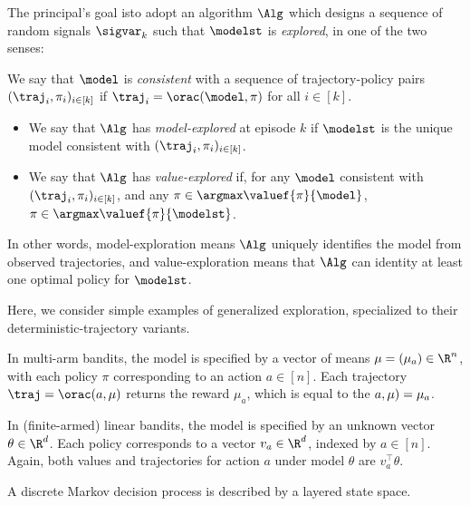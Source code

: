 The principal's goal isto adopt an algorithm $\Alg$ which designs a sequence of random signals $\sigvar_k$ such that $\modelst$ is \emph{explored}, in one of the two senses:
\begin{definition} We say that $\model$ is \emph{consistent} with a sequence of trajectory-policy pairs $(\traj_i,\pi_i)_{i \in [k]}$ if $\traj_i = \orac(\model,\pi)$ for all $i \in [k]$. 
\begin{itemize}
\item We say that $\Alg$ has \emph{model-explored} at episode $k$ if $\modelst$ is the unique model consistent with $(\traj_i,\pi_i)_{i \in [k]}$.
\item We say that $\Alg$ has \emph{value-explored} if, for any $\model$ consistent with $(\traj_i,\pi_i)_{i \in [k]}$, and any $\pi \in \argmax\valuef{\pi}{\model}$, $\pi \in \argmax\valuef{\pi}{\modelst}$.
\end{itemize} 
\end{definition}
In other words, model-exploration means $\Alg$ uniquely identifies the model from observed trajectories, and value-exploration means that $\Alg$ can identity at least one optimal policy for $\modelst$. 



Here, we consider simple examples of generalized exploration, specialized to their deterministic-trajectory variants. 
\begin{example} In multi-arm bandits, the model is specified by a vector of means $\mu  = (\mu_a) \in \R^{n}$,  with each policy $\pi$ corresponding to an action $a \in [n]$. Each trajectory $\traj = \orac(a,\mu)$ returns the reward $\mu_a$, which is equal to the $\value(a,\mu) = \mu_a$. 
\end{example}

\begin{example} In (finite-armed) linear bandits, the model is specified by an unknown vector $\theta \in \R^d$. Each policy corresponds to a vector $v_a \in \R^d$, indexed by $a \in [n]$. Again, both values and trajectories for action $a$ under model $\theta$ are $v_a^\top \theta$. 
\end{example}


\begin{example} A discrete Markov decision process is described by a layered state space. 
\end{example}

